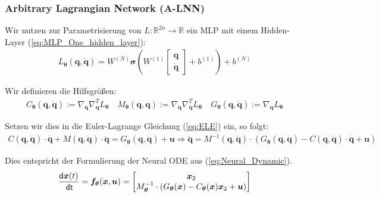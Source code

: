\documentclass[a4paper, 12pt]{scrartcl}
\newcommand{\dt}{\thinspace \mathsf{dt}}
\begin{document}
\subsubsection{Arbitrary Lagrangian Network (A-LNN)}

Wir nutzen zur Parametrisierung von $L:\mathbb{R}^{2n} \to \mathbb{R}$ 
ein MLP mit einem Hidden-Layer (\ref{eq:MLP_One_hidden_layer}):
%
\begin{align*}
    L_{\bm{\theta}}(\bm{q}, \bm{\dot{q}}) 
    = 
    W^{(N)} 
    \bm{\sigma}
    \left(
        W^{(1)}     
        \begin{bmatrix}
            \bm{q} \\
            \bm{\dot{q}}
        \end{bmatrix} 
        + b^{(1)} 
    \right)
    + b^{(N)}
\end{align*}

Wir definieren die Hilfsgrößen:
\begin{align*}
    C_{\bm{\theta}}(\bm{q}, \bm{\dot{q}}) 
    :=
    \nabla_{\bm{\dot{q}}} \nabla_{\bm{q}}^T L_{\bm{\theta}}
    \quad
    M_{\bm{\theta}}(\bm{q},\bm{\dot{q}})
    :=
    \nabla_{\bm{\dot{q}}} \nabla_{\bm{\dot{q}}}^T L_{\bm{\theta}}
    \quad
    G_{\bm{\theta}}(\bm{q}, \bm{\dot{q}}) 
    :=
    \nabla_{\bm{q}} L_{\bm{\theta}}
\end{align*}

Setzen wir dies in die Euler-Lagrange Gleichung (\ref{eq:ELE}) ein, so folgt:
%
\begin{align*}
    C(\bm{q}, \bm{\dot{q}})
    \cdot \bm{\dot{q}}
    +
    M(\bm{q},\bm{\dot{q}})
    \cdot \bm{\ddot{q}}
    = 
    G_{\bm{\theta}}(\bm{q}, \bm{\dot{q}})  + \bm{u}
    \Rightarrow
    \bm{\ddot{q}} 
    =
    M^{-1}(\bm{q},\bm{\dot{q}})
    \cdot
    \left(
        G_{\bm{\theta}}(\bm{q}, \bm{\dot{q}})  - C(\bm{q},\bm{\dot{q}}) \cdot \bm{\dot{q}} + \bm{u}
    \right)
\end{align*}

Dies entspricht der Formulierung der Neural ODE aus (\ref{eq:Neural_Dynamic}).
\begin{align*}
    \frac{\mathsf{d} \bm{x}(t)}{\dt}
    =
    \bm{f}_{\bm{\theta}}(\bm{x}, \bm{u})
    =
    \begin{bmatrix}
        \bm{x}_2 \\
        M_{\bm{\theta}}^{-1}
        \cdot
        \left(
            G_{\bm{\theta}}(\bm{x}) - C_{\bm{\theta}}(\bm{x}) \bm{x}_2 + \bm{u}
        \right)
    \end{bmatrix}
\end{align*}
\end{document}

